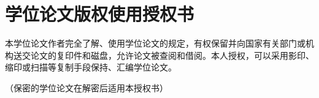 \chapter{学位论文版权使用授权书}
本学位论文作者完全了解、使用学位论文的规定，有权保留并向国家有关部门或机构送交论文的复印件和磁盘，允许论文被查阅和借阅。本人授权，可以采用影印、缩印或扫描等复制手段保持、汇编学位论文。


（保密的学位论文在解密后适用本授权书）
\vspace{4cm}
\autograph
